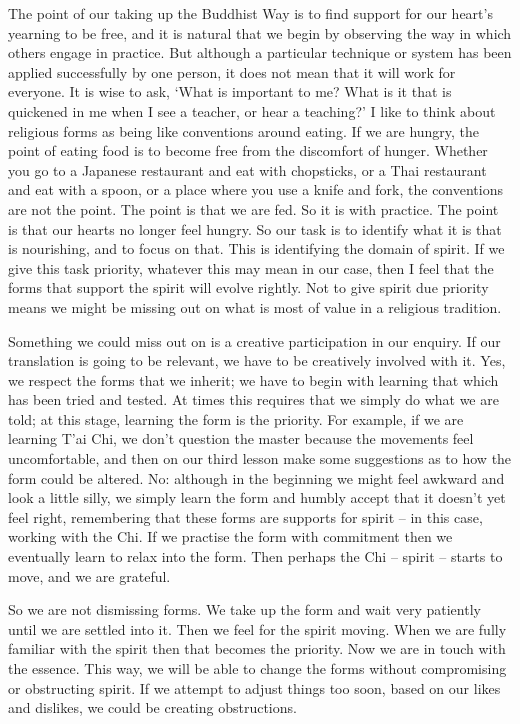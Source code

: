 The point of our taking up the Buddhist Way is to find support for our
heart's yearning to be free, and it is natural that we begin by
observing the way in which others engage in practice. But although a
particular technique or system has been applied successfully by one
person, it does not mean that it will work for everyone. It is wise to
ask, `What is important to me? What is it that is quickened in me when I
see a teacher, or hear a teaching?' I like to think about religious
forms as being like conventions around eating. If we are hungry, the
point of eating food is to become free from the discomfort of hunger.
Whether you go to a Japanese restaurant and eat with chopsticks, or a
Thai restaurant and eat with a spoon, or a place where you use a knife
and fork, the conventions are not the point. The point is that we are
fed. So it is with practice. The point is that our hearts no longer feel
hungry. So our task is to identify what it is that is nourishing, and to
focus on that. This is identifying the domain of spirit. If we give this
task priority, whatever this may mean in our case, then I feel that the
forms that support the spirit will evolve rightly. Not to give spirit
due priority means we might be missing out on what is most of value in a
religious tradition.

Something we could miss out on is a creative participation in our
enquiry. If our translation is going to be relevant, we have to be
creatively involved with it. Yes, we respect the forms that we inherit;
we have to begin with learning that which has been tried and tested. At
times this requires that we simply do what we are told; at this stage,
learning the form is the priority. For example, if we are learning T'ai
Chi, we don't question the master because the movements feel
uncomfortable, and then on our third lesson make some suggestions as to
how the form could be altered. No: although in the beginning we might
feel awkward and look a little silly, we simply learn the form and
humbly accept that it doesn't yet feel right, remembering that these
forms are supports for spirit -- in this case, working with the Chi. If
we practise the form with commitment then we eventually learn to relax
into the form. Then perhaps the Chi -- spirit -- starts to move, and we
are grateful.

So we are not dismissing forms. We take up the form and wait very
patiently until we are settled into it. Then we feel for the spirit
moving. When we are fully familiar with the spirit then that becomes the
priority. Now we are in touch with the essence. This way, we will be
able to change the forms without compromising or obstructing spirit. If
we attempt to adjust things too soon, based on our likes and dislikes,
we could be creating obstructions.

